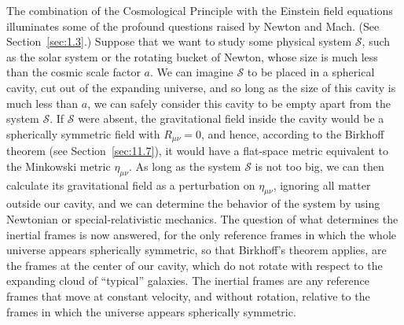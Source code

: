 The combination of the Cosmological Principle with the Einstein field
equations illuminates some of the profound questions raised by Newton and Mach.
(See Section~\ref{sec:1.3}.) Suppose that we want to study some physical
system \(\mathcal S\), such as the solar system or the rotating bucket of
Newton, whose size is much less than the cosmic scale factor \(a\). We can
imagine \(\mathcal S\) to be placed in a spherical cavity, cut out of the
expanding universe, and so long as the size of this cavity is much less than
\(a\), we can safely consider this cavity to be empty apart from the system
\(\mathcal S\). If \(\mathcal S\) were absent, the gravitational field
inside the cavity would be a spherically symmetric field with
\(R_{\mu\nu}=0\), and hence, according to the Birkhoff theorem (see
Section~\ref{sec:11.7}), it would have a flat-space metric equivalent to the
Minkowski metric \(\eta_{\mu\nu}\). As long as the system \(\mathcal S\) is
not too big, we can then calculate its gravitational field as a perturbation on
\(\eta_{\mu\nu}\), ignoring all matter outside our cavity, and we can
determine the behavior of the system by using Newtonian or special-relativistic
mechanics. The question of what determines the inertial frames is now answered,
for the only reference frames in which the whole universe appears spherically
symmetric, so that Birkhoff's theorem applies, are the frames at the center of
our cavity, which do not rotate with respect to the expanding cloud of
``typical'' galaxies. The inertial frames are any reference frames that move at
constant velocity, and without rotation, relative to the frames in which the
universe appears spherically symmetric.

